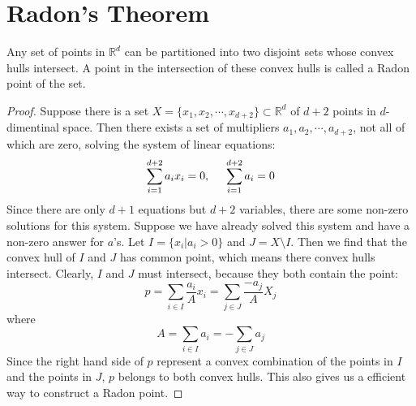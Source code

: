 \section{Radon's Theorem}
\begin{theorem}
  Any set of  points in $\mathbb{R}^d$ can be partitioned into two disjoint sets whose convex hulls intersect. A point in the intersection of these convex hulls is called a Radon point of the set.
\end{theorem}
\begin{proof}
  Suppose there is a set $X = \{x_1, x_2, \cdots, x_{d+2}\} \subset \mathbb{R}^d$ of $d+2$ points in $d$-dimentinal space. Then there exists a set of multipliers $a_1, a_2, \cdots, a_{d+2}$, not all of which are zero, solving the system of linear equations:
\[
  \sum_{i=1}^{d+2}a_ix_i = 0,\hspace{0.5cm} \sum_{i=1}^{d+2} a_i = 0
\]
Since there are only $d+1$ equations but $d+2$ variables, there are some non-zero solutions for this system. Suppose we have already solved this system and have a non-zero answer for $a$'s. Let $I = \{x_i|a_i > 0\}$ and $J = X\setminus I$. Then we find that the convex hull of $I$ and $J$ has common point, which means there convex hulls intersect. Clearly, $I$ and $J$ must intersect, because they both contain the point:
\[
  p = \sum_{i\in I} \frac{a_i}{A}x_i = \sum_{j\in J} \frac{-a_j}{A} X_j
\]
where
\[
  A = \sum_{i\in I} a_i = -\sum_{j\in J} a_j
\]
Since the right hand side of $p$ represent a convex combination of the points in $I$ and the points in $J$, $p$ belongs to both convex hulls. This also gives us a efficient way to construct a Radon point.
\end{proof}

